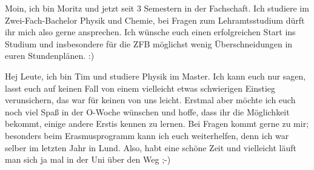 \begin{multicols}{2}
{
Moin, ich bin Moritz und jetzt seit 3 Semestern in der Fachschaft. Ich studiere im Zwei-Fach-Bachelor Physik und Chemie, bei Fragen zum Lehramtsstudium dürft ihr mich also gerne ansprechen. 
Ich wünsche euch einen erfolgreichen Start ins Studium und insbesondere für die ZFB möglichst wenig Überschneidungen in euren Stundenplänen. :)
}


{
Hej Leute, ich bin Tim und studiere Physik im Master. Ich kann euch nur sagen, lasst euch auf keinen Fall von einem vielleicht etwas schwierigen Einstieg verunsichern, das war für keinen von uns leicht. 
Erstmal aber möchte ich euch noch viel Spaß in der O-Woche wünschen und hoffe, dass ihr die Möglichkeit bekommt, einige andere Erstis kennen zu lernen. 
Bei Fragen kommt gerne zu mir; besonders beim Erasmusprogramm kann ich euch weiterhelfen, denn ich war selber im letzten Jahr in Lund. Also, habt eine schöne Zeit und vielleicht läuft man sich ja mal in der Uni über den Weg ;-)
}





\end{multicols}
